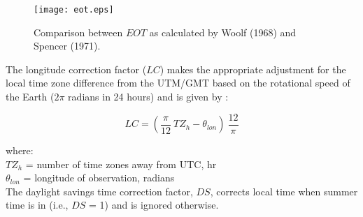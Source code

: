 \begin{figure}[ht!]
    \texttt{[image: eot.eps]}
    \caption{Comparison between $EOT$ as calculated by Woolf (1968) and Spencer (1971).}
    \label{fig:eot}
\end{figure}

The longitude correction factor ($LC$) makes the appropriate adjustment for the local time zone difference from the UTM/GMT based on the rotational speed of the Earth ($2\pi$ radians in 24 hours) and is given by \parencite{stine01}:

%
%
\begin{equation}
\label{eq:lc}
    LC = \left(\frac{\pi}{12}\: TZ_h - \theta_{lon}\right)\:
    \frac{12}{\pi}
\end{equation}

\noindent where: \\
\indent $TZ_{h}$ = number of time zones away from UTC, hr \\
\indent $\theta_{lon}$ = longitude of observation, radians \\

The daylight savings time correction factor, $DS$, corrects local time when summer time is in (i.e., $DS$ = 1) and is ignored otherwise.

